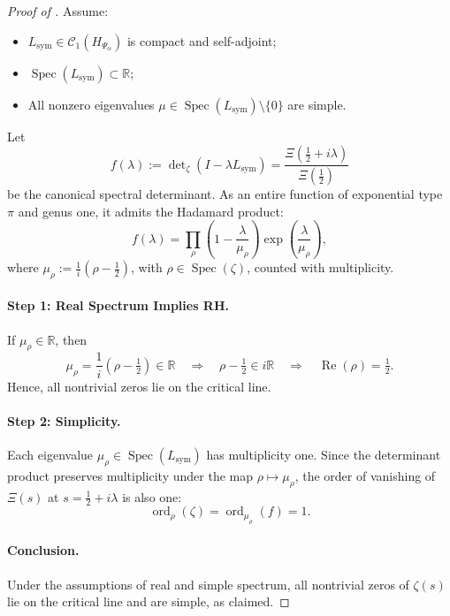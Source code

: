 \begin{proof}[Proof of ]
Assume:
\begin{itemize}
  \item \( L_{\mathrm{sym}} \in \mathcal{C}_1(H_{\Psi_\alpha}) \) is compact and self-adjoint;
  \item \( \operatorname{Spec}(L_{\mathrm{sym}}) \subset \mathbb{R} \);
  \item All nonzero eigenvalues \( \mu \in \operatorname{Spec}(L_{\mathrm{sym}}) \setminus \{0\} \) are simple.
\end{itemize}

Let
\[
f(\lambda) := \det\nolimits_\zeta(I - \lambda L_{\mathrm{sym}}) = \frac{\Xi\left(\tfrac{1}{2} + i\lambda\right)}{\Xi\left(\tfrac{1}{2}\right)}
\]
be the canonical spectral determinant. As an entire function of exponential type \( \pi \) and genus one, it admits the Hadamard product:
\[
f(\lambda) = \prod_\rho \left(1 - \frac{\lambda}{\mu_\rho} \right) \exp\left( \frac{\lambda}{\mu_\rho} \right),
\]
where \( \mu_\rho := \frac{1}{i}(\rho - \tfrac{1}{2}) \), with \( \rho \in \operatorname{Spec}(\zeta) \), counted with multiplicity.

\paragraph{Step 1: Real Spectrum Implies RH.}
If \( \mu_\rho \in \mathbb{R} \), then
\[
\mu_\rho = \frac{1}{i}(\rho - \tfrac{1}{2}) \in \mathbb{R} \quad \Rightarrow \quad \rho - \tfrac{1}{2} \in i\mathbb{R} \quad \Rightarrow \quad \operatorname{Re}(\rho) = \tfrac{1}{2}.
\]
Hence, all nontrivial zeros lie on the critical line.

\paragraph{Step 2: Simplicity.}
Each eigenvalue \( \mu_\rho \in \operatorname{Spec}(L_{\mathrm{sym}}) \) has multiplicity one. Since the determinant product preserves multiplicity under the map \( \rho \mapsto \mu_\rho \), the order of vanishing of \( \Xi(s) \) at \( s = \tfrac{1}{2} + i\lambda \) is also one:
\[
\operatorname{ord}_\rho(\zeta) = \operatorname{ord}_{\mu_\rho}(f) = 1.
\]

\paragraph{Conclusion.}
Under the assumptions of real and simple spectrum, all nontrivial zeros of \( \zeta(s) \) lie on the critical line and are simple, as claimed.
\end{proof}
